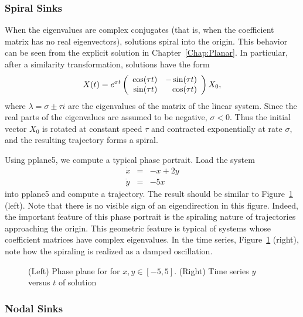 \documentclass{ximera}
\begin{document}
\subsubsection*{Spiral Sinks}

When the eigenvalues are complex conjugates (that is, when the
coefficient matrix has no real eigenvectors), solutions
spiral into the origin.  This behavior can be seen from the
explicit solution  in Chapter~\ref{Chap:Planar}.
In particular, after a similarity transformation, solutions have the form
\[
X(t)  = e^{\sigma t}\left(\begin{array}{rr} \cos(\tau t) & -\sin(\tau t)\\ \sin(\tau t) &\cos(\tau t)\end{array}\right)X_0,
\]
where $\lambda=\sigma\pm\tau i$ are the eigenvalues of
the matrix of the linear system.  Since the real parts of
the eigenvalues are assumed to be negative, $\sigma<0$.  Thus
the initial vector $X_0$ is rotated at constant speed $\tau$
and contracted exponentially at rate $\sigma$, and the
resulting trajectory forms a spiral.

Using {\sf pplane5}, we compute a typical
phase portrait.  Load the system
\begin{equation} \label{e:complex2}
\begin{array}{rcl}
\dot{x} & = & -x + 2y \\
\dot{y} & = & -5x
\end{array}
\end{equation}
into {\sf pplane5} and compute a trajectory.  The result should
be similar to Figure~\ref{rotfig} (left).  Note that there is no
visible sign of an eigendirection in this figure.
Indeed, the important feature of this phase portrait is the spiraling
nature of trajectories approaching the origin.  This geometric feature
is typical of systems whose coefficient matrices have complex
eigenvalues.  In the time series, Figure~\ref{rotfig} (right),
note how the spiraling is realized as a damped oscillation.

\begin{figure}[htb]
        \centerline{%
        }
        \caption{(Left) Phase plane for \protect{}
              for $x,y\in [-5,5]$.  (Right) Time series $y$ versus $t$
	      of solution}
        \label{rotfig}
\end{figure}




\subsubsection*{Nodal Sinks}
\end{document}
